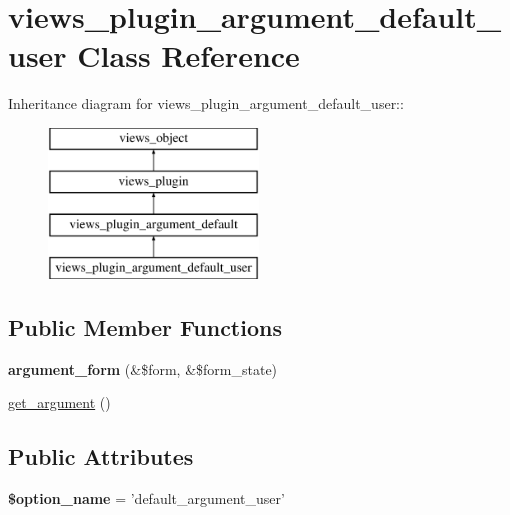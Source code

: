 \hypertarget{classviews__plugin__argument__default__user}{
\section{views\_\-plugin\_\-argument\_\-default\_\-user Class Reference}
\label{classviews__plugin__argument__default__user}
}
Inheritance diagram for views\_\-plugin\_\-argument\_\-default\_\-user::\begin{figure}[H]
\begin{center}
\leavevmode
\includegraphics[height=4cm]{classviews__plugin__argument__default__user}
\end{center}
\end{figure}
\subsection*{Public Member Functions}
\begin{CompactItemize}
\item 
\hypertarget{classviews__plugin__argument__default__user_5b135b8c12c3bc57af7d1035019db444}{
\textbf{argument\_\-form} (\&\$form, \&\$form\_\-state)}
\label{classviews__plugin__argument__default__user_5b135b8c12c3bc57af7d1035019db444}

\item 
\hyperlink{classviews__plugin__argument__default__user_f7dc56a3ce8a8cf8ad12595952dc70e6}{get\_\-argument} ()
\end{CompactItemize}
\subsection*{Public Attributes}
\begin{CompactItemize}
\item 
\hypertarget{classviews__plugin__argument__default__user_f97fc74c80fef793693482f57bcc1492}{
\textbf{\$option\_\-name} = 'default\_\-argument\_\-user'}
\label{classviews__plugin__argument__default__user_f97fc74c80fef793693482f57bcc1492}

\end{CompactItemize}


